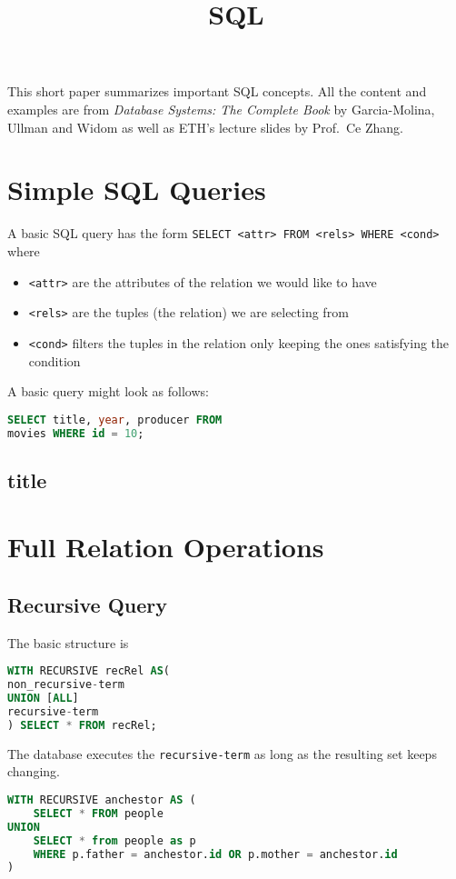 \documentclass{sciposter}
\title{\huge{SQL}}
\author{\vspace{-1cm}}
\newcommand{\TODO}[1]{\todo[inline]{\Large TODO:  #1}}
\renewcommand{\t}[1]{\texttt{#1}}
\begin{document}
\maketitle

\begin{multicols}{3}

This short paper summarizes important SQL concepts. All the content and examples are from \textit{Database Systems: The Complete Book} by Garcia-Molina, Ullman and Widom as well as ETH's lecture slides by Prof.\ Ce Zhang.




\section*{Simple SQL Queries}

A basic SQL query has the form \t{SELECT <attr> FROM <rels> WHERE <cond>} where 
\begin{itemize}
	\item \t{<attr>} are the attributes of the relation we would like to have
	\item \t{<rels>} are the tuples (the relation) we are selecting from
	\item \t{<cond>} filters the tuples in the relation only keeping the ones satisfying the condition
\end{itemize}

A basic query might look as follows:

\begin{lstlisting}[language=SQL]
SELECT title, year, producer FROM
movies WHERE id = 10;
\end{lstlisting}


\subsection*{title}



\section*{Full Relation Operations}

\TODO{...}


\subsection*{Recursive Query}
The basic structure is 
\begin{lstlisting}[language=SQL]
WITH RECURSIVE recRel AS(
non_recursive-term
UNION [ALL]
recursive-term
) SELECT * FROM recRel;
\end{lstlisting}
The database executes the \t{recursive-term} as long as the resulting set keeps changing.
\begin{lstlisting}[language=SQL]
WITH RECURSIVE anchestor AS (
	SELECT * FROM people
UNION
	SELECT * from people as p
	WHERE p.father = anchestor.id OR p.mother = anchestor.id
)


\end{lstlisting}
\end{multicols}
\end{document}
